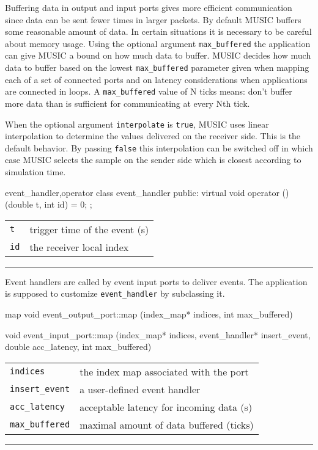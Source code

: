 \documentclass[a4paper]{report}
\makeatletter
\newenvironment{parameters}%
{\begin{tabular}{@{\hspace{2em}}lp{0.6\textwidth}}}%
{\end{tabular}\par\vspace{1mm}\par\hrule\par\vspace{5mm}}
\makeatother
\begin{document}
Buffering data in output and input ports gives more efficient
communication since data can be sent fewer times in larger packets.
By default MUSIC buffers some reasonable amount of data.  In certain
situations it is necessary to be careful about memory usage.  Using
the optional argument \lstinline|max_buffered| the application can
give MUSIC a bound on how much data to buffer.  MUSIC decides how much
data to buffer based on the lowest \lstinline|max_buffered| parameter
given when mapping each of a set of connected ports and on latency
considerations when applications are connected in loops.  A
\lstinline|max_buffered| value of N ticks means: don't buffer more
data than is sufficient for communicating at every Nth tick.

When the optional argument \lstinline|interpolate| is
\lstinline|true|, MUSIC uses linear interpolation to determine the
values delivered on the receiver side.  This is the default behavior.
By passing \lstinline|false| this interpolation can be switched off in
which case MUSIC selects the sample on the sender side which is
closest according to simulation time.

\begin{head}{event_handler,operator}
  class event_handler {
  public:
    virtual void operator () (double t, int id) = 0;
  };
\end{head}
\begin{parameters}
  \lstinline|t| & trigger time of the event (s) \\
  \lstinline|id| & the receiver local index \\
\end{parameters}

Event handlers are called by event input ports to deliver events.  The
application is supposed to customize \lstinline|event_handler| by
subclassing it.

\begin{head}{map}
  void event_output_port::map (index_map* indices,
                               int max_buffered)

  void event_input_port::map (index_map* indices,
                              event_handler* insert_event,
                              double acc_latency,
                              int max_buffered)
\end{head}
\begin{parameters}
  \lstinline|indices| & the index map associated with the port \\
  \lstinline|insert_event| & a user-defined event handler \\
  \lstinline|acc_latency| & acceptable latency for incoming data (s) \\
  \lstinline|max_buffered| & maximal amount of data buffered (ticks) \\
\end{parameters}
\end{document}
